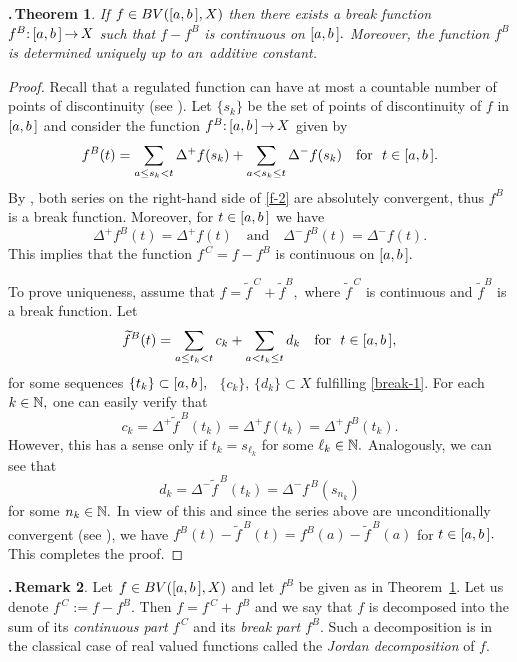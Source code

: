 \documentclass[12pt,twoside]{article}
\numberwithin{equation}{section}
\theoremstyle{plain}
\newtheorem{theorem}{\hskip-1mm.\,Theorem}[section]
\theoremstyle{definition}
\newtheorem{remark}[theorem]{\hskip-1mm.\,Remark}
\begin{document}
{\begin{theorem}\label{jordan}
If $f\in BV([a,b\,],X)$ then there exists a break function $f^B{:}\,[a,b\,]\,{\to}\,X$ such that
$f-f^B$ is continuous on $[a,b\,].$ Moreover, the function $f^B$ is determined uniquely up
to an~additive constant.
\end{theorem}
\begin{proof} Recall that a regulated function can have at most a countable number
of points of discontinuity (see \cite[Corollary I.3.2]{H}). Let $\{s_k\}$ be the set
of points of discontinuity of $f$ in $[a,b\,]$ and consider the function
$f^B{:}\,[a,b\,]\,{\to}\,X$ given by
\begin{equation}\label{f-2}
    f^B(t)=\sum_{a\le s_k<t}\Delta^+f(s_k)+\sum_{a<s_k\le t}\Delta^-f(s_k)
    \quad\mbox{for \ } t\in\ab.
\end{equation}
By \cite[Lemma 4.1]{MT2}, both series on the right-hand side of \eqref{f-2} are absolutely
convergent, thus $f^B$ is a break function. Moreover, for $t\in[a,b\,]$ we have
\[
   \Delta^+f^B(t)=\Delta^+f(t)
   \quad\mbox{and}\quad
   \Delta^-f^B(t)=\Delta^-f(t).
\]
This implies that the function $f^{\,C}=f-f^B$ is continuous on $[a,b\,].$

\smallskip

To prove uniqueness, assume that $f=\widetilde{f}^{\,C}+\widetilde{f}^B,$ where
$\widetilde{f}^{\,C}$ is continuous and $\widetilde{f}^B$ is a break function. Let
\[
   \widetilde{f}^B(t)=\sum_{a\le t_k<t}c_k+\sum_{a<t_k\le t}d_k \quad\mbox{for \ } t\in[a,b\,],
\]
for some sequences $\{t_k\}\subset[a,b\,],$ \ $\{c_k\},\,\{d_k\}\subset X$ fulfilling
\eqref{break-1}. For each $k\in{\mathbb N},$ one can easily verify that
\begin{equation}\label{c_k}
   c_k=\Delta^+\widetilde{f}^{\,B}(t_k)=\Delta^+f(t_k)=\Delta^+f^B(t_k).
\end{equation}
However, this has a sense only if $t_k=s_{\ell_k}$ for some $\ell_k\in{\mathbb N}.$ Analogously,
we can see that
\begin{equation}\label{d_k}
   d_k=\Delta^-\widetilde{f}^{\,B}(t_k)=\Delta^-f^{\,B}(s_{n_k})
\end{equation}
for some $n_k\in{\mathbb N}.$ In view of this and since the series above are unconditionally
convergent (see \cite[Chapter VI]{Di}), we have
$f^B(t)-\widetilde{f}^{\,B}(t)=f^B(a)-\widetilde{f}^{\,B}(a)$ for $t\in[a,b\,].$
This completes the proof.
\end{proof}

\skipaline

\begin{remark}\label{jordan-rem}
Let $f\in BV([a,b\,],X)$ and let $f^B$ be given as in Theorem~\ref{jordan}. Let us denote $f^{\,C}:=f-f^B.$
Then $f=f^{\,C}+f^B$ and we say that $f$ is decomposed into the sum of its {\em continuous part} $f^{\,C}$
and its {\em break part} $f^B.$ Such a decomposition is in the classical case of real valued functions
called the {\em Jordan decomposition} of $f.$


\end{remark}}
\end{document}

